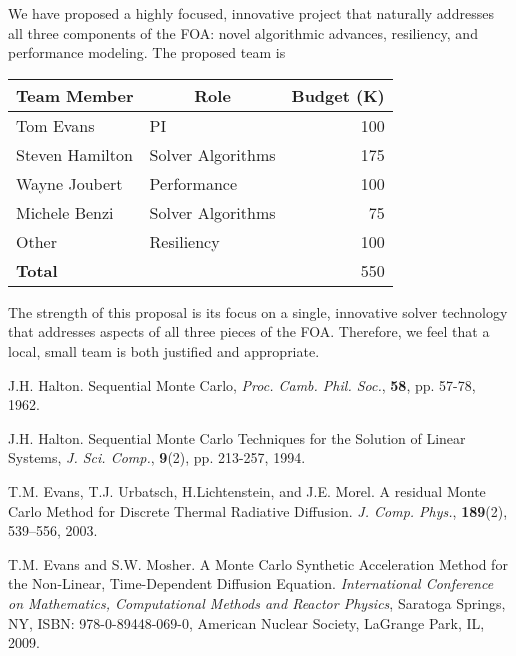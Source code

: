 \documentclass[10pt,letterpaper,english]{article}
\begin{document}
We have proposed a highly focused, innovative project that naturally addresses
all three components of the FOA: novel algorithmic advances, resiliency, and
performance modeling.  The proposed team is 
\begin{center}
  \begin{tabular}{llr}\hline\hline
    \multicolumn{1}{c}{Team Member} & 
    \multicolumn{1}{c}{Role}        & 
    \multicolumn{1}{c}{Budget (K)} \\\hline
    Tom Evans       & PI                & 100  \\
    Steven Hamilton & Solver Algorithms & 175  \\
    Wayne Joubert   & Performance       & 100  \\
    Michele Benzi   & Solver Algorithms & 75   \\
    Other           & Resiliency        & 100  \\ \hline
    {\bf Total}     &                   & 550  \\
    \hline\hline
  \end{tabular}
\end{center}
The strength of this proposal is its focus on a single, innovative solver
technology that addresses aspects of all three pieces of the FOA.  Therefore,
we feel that a local, small team is both justified and appropriate.


\begin{thebibliography}{300}

  J.H. Halton. Sequential Monte Carlo, \textit{
    Proc. Camb. Phil. Soc.}, {\bf 58}, pp. 57-78, 1962.

  J.H. Halton. Sequential Monte Carlo Techniques for the
  Solution of Linear Systems, \textit{J. Sci. Comp.}, {\bf 9}(2), pp. 213-257,
  1994.
  
  T.M. Evans, T.J. Urbatsch, H.Lichtenstein, and J.E. Morel. A
  residual Monte Carlo Method for Discrete Thermal Radiative
  Diffusion. \textit{J. Comp. Phys.}, {\bf 189}(2), 539--556, 2003.

  T.M. Evans and S.W. Mosher.  A Monte Carlo Synthetic
  Acceleration Method for the Non-Linear, Time-Dependent Diffusion
  Equation.  \textit{International Conference on Mathematics,
    Computational Methods and Reactor Physics}, Saratoga Springs, NY,
  ISBN: 978-0-89448-069-0, American Nuclear Society, LaGrange Park,
  IL, 2009.

\end{thebibliography}
\end{document}
